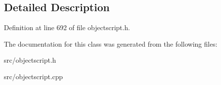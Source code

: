 \subsection{Detailed Description}


Definition at line 692 of file objectscript.\+h.



The documentation for this class was generated from the following files\+:\begin{DoxyCompactItemize}
\item 
src/objectscript.\+h\item 
src/objectscript.\+cpp\end{DoxyCompactItemize}
